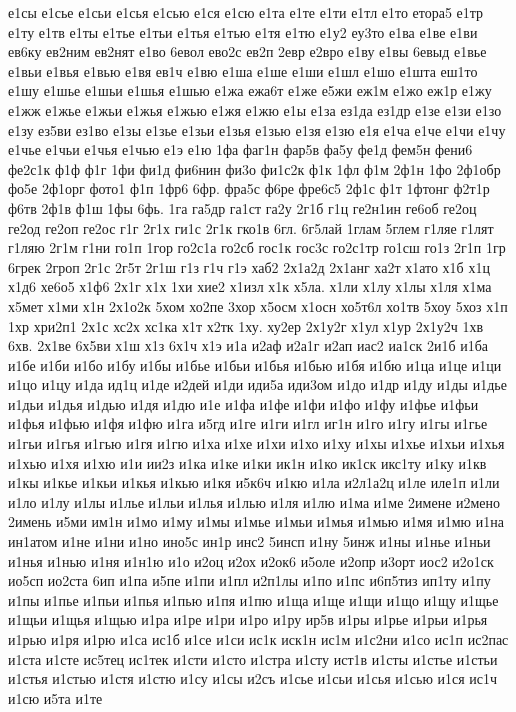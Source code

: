 {е1сы
е1сье
е1сьи
е1сья
е1сью
е1ся
е1сю
е1та
е1те
е1ти
е1тл
е1то
етора5
е1тр
е1ту
е1тв
е1ты
е1тье
е1тьи
е1тья
е1тью
е1тя
е1тю
е1у2
еу3то
е1ва
е1ве
е1ви
ев6ку
ев2ним
ев2нят
е1во
6евол
ево2с
ев2п
2евр
е2вро
е1ву
е1вы
6евыд
е1вье
е1вьи
е1вья
е1вью
е1вя
ев1ч
е1вю
е1ша
е1ше
е1ши
е1шл
е1шо
е1шта
еш1то
е1шу
е1шье
е1шьи
е1шья
е1шью
е1жа
ежа6т
е1же
е5жи
еж1м
е1жо
еж1р
е1жу
е1жж
е1жье
е1жьи
е1жья
е1жью
е1жя
е1жю
е1ы
е1за
ез1да
ез1др
е1зе
е1зи
е1зо
е1зу
ез5ви
ез1во
е1зы
е1зье
е1зьи
е1зья
е1зью
е1зя
е1зю
е1я
е1ча
е1че
е1чи
е1чу
е1чье
е1чьи
е1чья
е1чью
е1э
е1ю
1фа
фаг1н
фар5в
фа5у
фе1д
фем5н
фени6
фе2с1к
ф1ф
ф1г
1фи
фи1д
фи6нин
фи3о
фи1с2к
ф1к
1фл
ф1м
2ф1н
1фо
2ф1обр
фо5е
2ф1орг
фото1
ф1п
1фр6
6фр.
фра5с
ф6ре
фре6с5
2ф1с
ф1т
1фтонг
ф2т1р
ф6тв
2ф1в
ф1ш
1фы
6фь.
1га
га5др
га1ст
га2у
2г1б
г1ц
ге2н1ин
ге6об
ге2оц
ге2од
ге2оп
ге2ос
г1г
2г1х
ги1с
2г1к
гко1в
6гл.
6г5лай
1глам
5глем
г1ляе
г1лят
г1ляю
2г1м
г1ни
го1п
1гор
го2с1а
го2сб
гос1к
гос3с
го2с1тр
го1сш
го1з
2г1п
1гр
6грек
2гроп
2г1с
2г5т
2г1ш
г1з
г1ч
г1э
хаб2
2х1а2д
2х1анг
ха2т
х1ато
х1б
х1ц
х1д6
хе6о5
х1ф6
2х1г
х1х
1хи
хие2
х1изл
х1к
х5ла.
х1ли
х1лу
х1лы
х1ля
х1ма
х5мет
х1ми
х1н
2х1о2к
5хом
хо2пе
3хор
х5осм
х1осн
хо5т6л
хо1тв
5хоу
5хоз
х1п
1хр
хри2п1
2х1с
хс2х
хс1ка
х1т
х2тк
1ху.
ху2ер
2х1у2г
х1ул
х1ур
2х1у2ч
1хв
6хв.
2х1ве
6х5ви
х1ш
х1з
6х1ч
х1э
и1а
и2аф
и2а1г
и2ап
иас2
иа1ск
2и1б
и1ба
и1бе
и1би
и1бо
и1бу
и1бы
и1бье
и1бьи
и1бья
и1бью
и1бя
и1бю
и1ца
и1це
и1ци
и1цо
и1цу
и1да
ид1ц
и1де
и2дей
и1ди
иди5а
иди3ом
и1до
и1др
и1ду
и1ды
и1дье
и1дьи
и1дья
и1дью
и1дя
и1дю
и1е
и1фа
и1фе
и1фи
и1фо
и1фу
и1фье
и1фьи
и1фья
и1фью
и1фя
и1фю
и1га
и5гд
и1ге
и1ги
и1гл
иг1н
и1го
и1гу
и1гы
и1гье
и1гьи
и1гья
и1гью
и1гя
и1гю
и1ха
и1хе
и1хи
и1хо
и1ху
и1хы
и1хье
и1хьи
и1хья
и1хью
и1хя
и1хю
и1и
ии2з
и1ка
и1ке
и1ки
ик1н
и1ко
ик1ск
икс1ту
и1ку
и1кв
и1кы
и1кье
и1кьи
и1кья
и1кью
и1кя
и5к6ч
и1кю
и1ла
и2л1а2ц
и1ле
иле1п
и1ли
и1ло
и1лу
и1лы
и1лье
и1льи
и1лья
и1лью
и1ля
и1лю
и1ма
и1ме
2имене
и2мено
2имень
и5ми
им1н
и1мо
и1му
и1мы
и1мье
и1мьи
и1мья
и1мью
и1мя
и1мю
и1на
ин1атом
и1не
и1ни
и1но
ино5с
ин1р
инс2
5инсп
и1ну
5инж
и1ны
и1нье
и1ньи
и1нья
и1нью
и1ня
и1н1ю
и1о
и2оц
и2ох
и2ок6
и5оле
и2опр
и3орт
иос2
и2о1ск
ио5сп
ио2ста
6ип
и1па
и5пе
и1пи
и1пл
и2п1лы
и1по
и1пс
и6п5тиз
ип1ту
и1пу
и1пы
и1пье
и1пьи
и1пья
и1пью
и1пя
и1пю
и1ща
и1ще
и1щи
и1що
и1щу
и1щье
и1щьи
и1щья
и1щью
и1ра
и1ре
и1ри
и1ро
и1ру
ир5в
и1ры
и1рье
и1рьи
и1рья
и1рью
и1ря
и1рю
и1са
ис1б
и1се
и1си
ис1к
иск1н
ис1м
и1с2ни
и1со
ис1п
ис2пас
и1ста
и1сте
ис5тец
ис1тек
и1сти
и1сто
и1стра
и1сту
ист1в
и1сты
и1стье
и1стьи
и1стья
и1стью
и1стя
и1стю
и1су
и1сы
и2съ
и1сье
и1сьи
и1сья
и1сью
и1ся
ис1ч
и1сю
и5та
и1те
}

